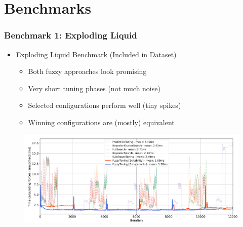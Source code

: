 \documentclass[
	10pt,
	t		%
]{beamer}
\begin{document}
\section{Benchmarks}
\begin{frame}
	\frametitle{Benchmark 1: Exploding Liquid}
	\begin{itemize}
		\item Exploding Liquid Benchmark (Included in Dataset)
		      \begin{itemize}
			      \item Both fuzzy approaches look promising
			      \item Very short tuning phases (not much noise)
			      \item Selected configurations perform well (tiny spikes)
			      \item Winning configurations are (mostly) equivalent
		      \end{itemize}
	\end{itemize}
	
	\begin{figure}
		\centering
		\includegraphics[width=1\textwidth]{figures/exploding-liquid-timings.png}
	\end{figure}
\end{frame}
\end{document}
